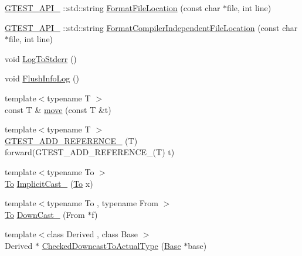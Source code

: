 \begin{DoxyCompactItemize}
\item 
\mbox{\hyperlink{gtest-port_8h_aa73be6f0ba4a7456180a94904ce17790}{G\+T\+E\+S\+T\+\_\+\+A\+P\+I\+\_\+}} \+::std\+::string \mbox{\hyperlink{namespacetesting_1_1internal_a31b7c3abed4a7c395f42c61e993989f4}{Format\+File\+Location}} (const char $\ast$file, int line)
\item 
\mbox{\hyperlink{gtest-port_8h_aa73be6f0ba4a7456180a94904ce17790}{G\+T\+E\+S\+T\+\_\+\+A\+P\+I\+\_\+}} \+::std\+::string \mbox{\hyperlink{namespacetesting_1_1internal_a1ee4cde97868c53e442d3182496a9f3c}{Format\+Compiler\+Independent\+File\+Location}} (const char $\ast$file, int line)
\item 
void \mbox{\hyperlink{namespacetesting_1_1internal_a06b1b20029fbd1dbeb59752f914fab84}{Log\+To\+Stderr}} ()
\item 
void \mbox{\hyperlink{namespacetesting_1_1internal_a2135f223bf6b527729aeaa651115183b}{Flush\+Info\+Log}} ()
\item 
{\footnotesize template$<$typename T $>$ }\\const T \& \mbox{\hyperlink{namespacetesting_1_1internal_a0f6d06bf8c3093b9c22bb08723db201e}{move}} (const T \&t)
\item 
{\footnotesize template$<$typename T $>$ }\\\mbox{\hyperlink{namespacetesting_1_1internal_a3b78178c942d020bb164d80d8c778bff}{G\+T\+E\+S\+T\+\_\+\+A\+D\+D\+\_\+\+R\+E\+F\+E\+R\+E\+N\+C\+E\+\_\+}} (T) forward(G\+T\+E\+S\+T\+\_\+\+A\+D\+D\+\_\+\+R\+E\+F\+E\+R\+E\+N\+C\+E\+\_\+(T) t)
\item 
{\footnotesize template$<$typename To $>$ }\\\mbox{\hyperlink{classtesting_1_1internal_1_1To}{To}} \mbox{\hyperlink{namespacetesting_1_1internal_a982df3f369643b175f79cda4048bc3b9}{Implicit\+Cast\+\_\+}} (\mbox{\hyperlink{classtesting_1_1internal_1_1To}{To}} x)
\item 
{\footnotesize template$<$typename To , typename From $>$ }\\\mbox{\hyperlink{classtesting_1_1internal_1_1To}{To}} \mbox{\hyperlink{namespacetesting_1_1internal_a1a1a1aed3fe00908b8a45d5ab4a33665}{Down\+Cast\+\_\+}} (From $\ast$f)
\item 
{\footnotesize template$<$class Derived , class Base $>$ }\\Derived $\ast$ \mbox{\hyperlink{namespacetesting_1_1internal_abfe9bfb020d38aa4e0e12c001911b22b}{Checked\+Downcast\+To\+Actual\+Type}} (\mbox{\hyperlink{classBase}{Base}} $\ast$base)
\item 

\end{DoxyCompactItemize}
